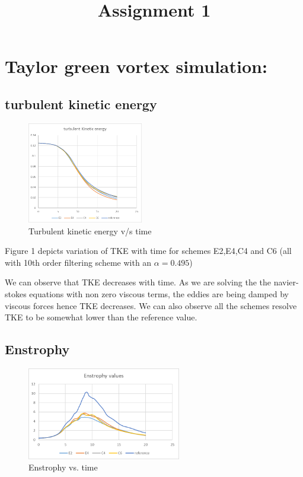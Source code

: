 \documentclass{hcmut-report}
\title{Assignment 1}
\begin{document}
\coverpage

\section{Taylor green vortex simulation:}
    \subsection{turbulent kinetic energy}
    \begin{figure}[H]
        \centering
        \includegraphics[width=0.45\textwidth]{graphics/tke.png}
        \caption{Turbulent kinetic energy v/s time}
        \label{fig:my_label}
    \end{figure}

    Figure 1 depicts variation of TKE with time for schemes E2,E4,C4 and C6 (all with 10th order filtering scheme with an $\alpha = 0.495$)

    We can observe that TKE decreases with time. As we are solving the the navier-stokes equations with non zero viscous terms, the eddies are being damped by viscous forces hence TKE decreases. We can also observe all the schemes resolve TKE to be somewhat lower than the reference value.

    \subsection{Enstrophy}
    \begin{figure}[H]
        \centering
        \includegraphics[width=0.6\textwidth]{graphics/enstrophy.png}
        \caption{Enstrophy vs. time}
        \label{fig:my_label}
    \end{figure}
\end{document}
